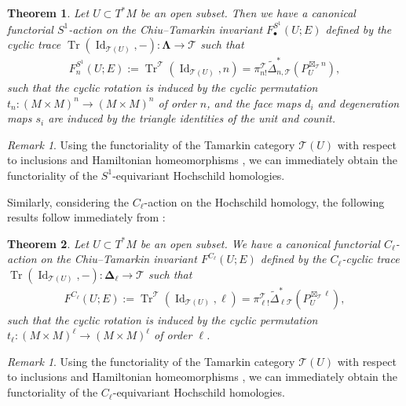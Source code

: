 \documentclass[11pt]{amsart}
\numberwithin{equation}{section}
\theoremstyle{plain}
\newtheorem{Thm}{Theorem}[section]
\theoremstyle{definition}
\theoremstyle{remark}
\newtheorem{RMK}[rmk]{Remark}
\newcommand{\sT} { {\mathscr{T}}}
\newcommand{\Id}{{\operatorname{Id}}}
\newcommand\Tr{\operatorname{Tr}}
\begin{document}
\begin{Thm}\label{thm:S1-action}
    Let $U \subset T^*M$ be an open subset. Then we have a canonical functorial $S^1$-action on the Chiu--Tamarkin invariant $F^{S^1}_\bullet(U; E)$ defined by the cyclic trace $\Tr(\Id_{\sT(U)}, -): \boldsymbol{\Lambda} \to \sT$ such that
    \begin{align}\label{eq:trace-circle}
    F^{S^1}_n(U; E) := \Tr^\sT(\Id_{\sT(U)}, n) = \pi_{n!}^\sT\widetilde{\Delta}_{n,\sT}^*(P_U^{\boxtimes_\sT n}),
    \end{align}
    such that the cyclic rotation is induced by the cyclic permutation $t_{n}: (M \times M)^{n} \to (M \times M)^{n}$ of order $n$, and the face maps $d_i$ and degeneration maps $s_i$ are induced by the triangle identities of the unit and counit.
\end{Thm}
\begin{RMK}
    Using the functoriality of the Tamarkin category $\sT(U)$ with respect to inclusions and Hamiltonian homeomorphisms \cite{asanoike2022complete,guillermouviterbo_gammasupport}, we can immediately obtain the functoriality of the $S^1$-equivariant Hochschild homologies.
\end{RMK}

Similarly, considering the $C_\ell$-action on the Hochschild homology, the following results follow immediately from  \cite[Theorem 5.9]{Li-Zhang26-1}:

\begin{Thm}\label{thm:Z/ell-action}
    Let $U \subset T^*M$ be an open subset. We have a canonical functorial $C_\ell$-action on the Chiu--Tamarkin invariant $F^{C_\ell}(U; E)$ defined by the $C_\ell$-cyclic trace $\Tr(\Id_{\sT(U)}, -): \boldsymbol{\Delta}_\ell \to \sT$ such that
    \begin{align}\label{eq:trace-finite-group}
    F^{C_\ell}(U; E) := \Tr^\sT(\Id_{\sT(U)}, \ell) = \pi_{\ell!}^\sT\widetilde{\Delta}_{\ell\sT}^*(P_U^{\boxtimes_\sT \ell}),
    \end{align}
    such that the cyclic rotation is induced by the cyclic permutation $t_\ell: (M \times M)^{\ell} \to (M \times M)^{\ell}$ of order $\ell$.
\end{Thm}

\begin{RMK}
    Using the functoriality of the Tamarkin category $\sT(U)$ with respect to inclusions and Hamiltonian homeomorphisms \cite{asanoike2022complete,guillermouviterbo_gammasupport}, we can immediately obtain the functoriality of the $C_\ell$-equivariant Hochschild homologies.
\end{RMK}
\end{document}
